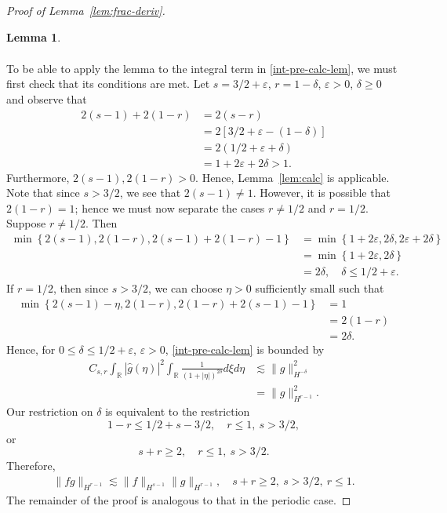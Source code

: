 \documentclass[12pt,reqno]{amsart}
\numberwithin{equation}{section}  %
\numberwithin{figure}{section}
\newcommand{\rr}{\mathbb{R}}
\newcommand{\wh}{\widehat}
\newcommand{\ee}{\varepsilon}
\newtheorem{lemma}{Lemma}
\begin{document}
\begin{proof}[Proof of Lemma~\ref{lem:frac-deriv}]
\begin{lemma}
\begin{equation*}
\begin{split}
\end{split}
\end{equation*}
\end{lemma}
To be able to apply the lemma to the integral term in \eqref{int-pre-calc-lem}, 
we must first check
that its conditions are met. Let $ s = 3/2 + \ee$, $r = 1- \delta$, $\ee > 0$, $
\delta \ge 0$ and observe that
%
%
\begin{equation*}
\begin{split}
2(s-1) + 2(1-r)
& = 2(s-r)
\\
& = 2[3/2 + \ee - (1 - \delta)]
\\
& = 2(1/2 + \ee + \delta)
\\
& = 1 + 2 \ee + 2 \delta > 1.
\end{split}
\end{equation*}
%
%
Furthermore, $2(s-1), 2(1-r) > 0$. Hence, Lemma~\ref{lem:calc} is applicable. 
Note that since $s > 3/2$, we see that $2(s-1) \neq 1$. However, it is possible that $2(1-r) =1$; hence we must now separate the cases $r \neq 1/2$ and $r = 1/2$. Suppose $r \neq 1/2$. Then 
%
%
\begin{equation*}
\begin{split}
\min\left\{ 2(s-1), 2(1-r), 2(s-1) + 2(1-r) -1 \right\}
& = \min\left\{ 1 + 2 \ee, 2 \delta, 2\ee + 2 \delta \right\}
\\
& = \min\left\{ 1 + 2 \ee, 2 \delta\right\}
\\
& = 2 \delta, \quad \delta \le 1/2 + \ee.
\end{split}
\end{equation*}
%
If $r = 1/2$, then since $s > 3/2$, we can choose $\eta > 0$ sufficiently small
such that
%
%
\begin{equation*}
\begin{split}
\min\left\{ 2(s-1) -\eta , 2(1-r), 2(1-r) + 2(s-1) - 1  \right\}
& = 1 
\\
& = 2(1 -r)
\\
& = 2\delta.
\end{split}
\end{equation*}
%
Hence, for $0 \le \delta \le 1/2 + \ee$, $\ee >
0$, \eqref{int-pre-calc-lem} is bounded by
\begin{equation*}
\begin{split}
C_{s,r} \int_{\rr}  | \wh{g}(\eta) |^{2} \int_{\rr} \frac{1}{\left( 1
+ |\eta| \right )^{2 \delta}} d \xi d \eta 
& \lesssim
\| g \|_{H^{-\delta}}^{2}
\\
& = \| g \|_{H^{r-1}}^{2}.
\end{split}
\end{equation*}
%
Our restriction on $\delta$ is equivalent to the restriction 
$$1-r \le 1/2 + s - 3/2, \quad r \le 1, \ s > 3/2,$$ or
$$s + r \ge 2,  \quad  r \le 1, \ s > 3/2.$$ Therefore, 
%
%
%
%
\begin{equation*}
\begin{split}
\| f g \|_{H^{r-1}} \lesssim \| f \|_{H^{s-1}} \| g \|_{H^{r-1}},
\quad s + r \ge 2, \ s > 3/2, \ r \le 1.
\end{split}
\end{equation*}
%
%
The remainder of the proof is analogous to that in the periodic case.
\end{proof}
\end{document}
